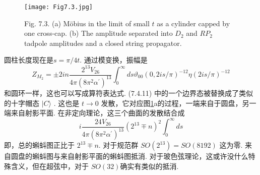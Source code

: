 \begin{figure}
	\begin{center}
		\texttt{[image: Fig7.3.jpg]}\\
		\caption{Fig. 7.3. (a) Möbius in the limit of small $t$ as a cylinder capped by one cross-cap. (b) The amplitude separated into $D_{2}$ and $R P_{2}$ tadpole amplitudes and a closed string propagator.}\label{Fig7.3}
	\end{center}
\end{figure}

圆柱长度现在是$s=\pi / 4 t$. 通过模变换，振幅是
\begin{equation}
Z_{M_{2}}=\pm 2 i n \frac{2^{13} V_{26}}{4 \pi\left(8 \pi^{2} \alpha^{\prime}\right)^{13}} \int_{0}^{\infty} d s \vartheta_{00}(0,2 i s / \pi)^{-12} \eta(2 i s / \pi)^{-12}
\end{equation}
和圆环一样，这也可以写成算符表达式. (7.4.11) 中的一个边界态被替换成了类似的十字帽态 $|C\rangle $ . 这也是 $t \rightarrow 0$ 发散，它对应图\ref{Fig7.3}a的过程，一端来自于圆盘，另一端来自射影平面. 在非定向理论，这三个曲面的发散结合成
\begin{equation}
	i \frac{24 V_{26}}{4 \pi\left(8 \pi^{2} \alpha^{\prime}\right)^{13}}\left(2^{13} \mp n\right)^{2} \int_{0}^{\infty} d s
\end{equation}
即，总的蝌蚪图正比于 $2^{13} \mp n $. 对于规范群 $S O\left(2^{13}\right)=S O(8192)$ 这为零. 来自圆盘的蝌蚪图与来自射影平面的蝌蚪图抵消. 对于玻色弦理论，这或许没什么特殊含义，但在超弦中，对于 $S O(32)$确实有类似的抵消.